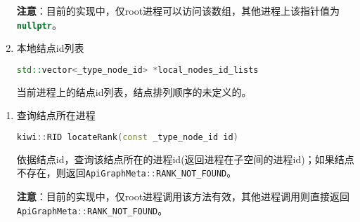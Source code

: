 \begin{enumerate}
\textbf{注意}：目前的实现中，仅root进程可以访问该数组，其他进程上该指针值为\lstinline[language=c++]{nullptr}。

  \item 本地结点id列表
\begin{lstlisting}[language=c++]
    std::vector<_type_node_id> *local_nodes_id_lists 
\end{lstlisting}
当前进程上的结点id列表，结点排列顺序的未定义的。

\end{enumerate}

\begin{enumerate}
\subsubsection*{GraphMeta方法}
  \item 查询结点所在进程
\begin{lstlisting}[language=c++]
    kiwi::RID locateRank(const _type_node_id id)
\end{lstlisting}
依据结点id，查询该结点所在的进程id(返回进程在子空间的进程id)；如果结点不存在，则返回\lstinline[language=c++]{ApiGraphMeta::RANK_NOT_FOUND}。

\textbf{注意}：目前的实现中，仅root进程调用该方法有效，其他进程调用则直接返回\lstinline[language=c++]{ApiGraphMeta::RANK_NOT_FOUND}。
\end{enumerate}
